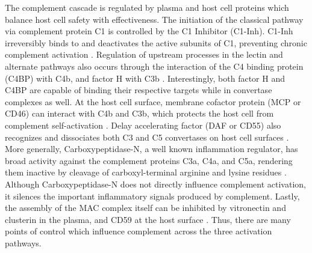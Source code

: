 \documentclass[12pt]{article}
\begin{document}
The complement cascade is regulated by plasma and host cell proteins which balance host cell safety with effectiveness.
The initiation of the classical pathway via complement protein C1 is controlled by the C1 Inhibitor (C1-Inh).
C1-Inh irreversibly binds to and deactivates the active subunits of C1, preventing chronic complement activation \cite{walker1995complement}.
Regulation of upstream processes in the lectin and alternate pathways also occurs through the interaction of the C4 binding protein (C4BP) with C4b, and factor H with C3b \cite{blom2001structural}. Interestingly,
both factor H and C4BP are capable of binding their respective targets while in convertase complexes as well.
At the host cell surface, membrane cofactor protein (MCP or CD46) can interact with C4b and C3b, which protects the host cell from complement self-activation \cite{riley2004cd46}.
Delay accelerating factor (DAF or CD55) also recognizes and dissociates both C3 and C5 convertases on host cell surfaces \cite{lukacik2004complement}.
More generally, Carboxypeptidase-N, a well known inflammation regulator, has broad activity against the complement proteins C3a, C4a, and C5a, rendering them inactive by cleavage of carboxyl-terminal arginine and lysine residues \cite{liszewski1995control}.
Although Carboxypeptidase-N does not directly influence complement activation, it silences the important inflammatory signals produced by complement.
Lastly, the assembly of the MAC complex itself can be inhibited by vitronectin and clusterin in the plasma, and CD59 at the host surface \cite{chauhan2006presence,zewde2016quantitative}.
Thus, there are many points of control which influence complement across the three activation pathways.
\end{document}
